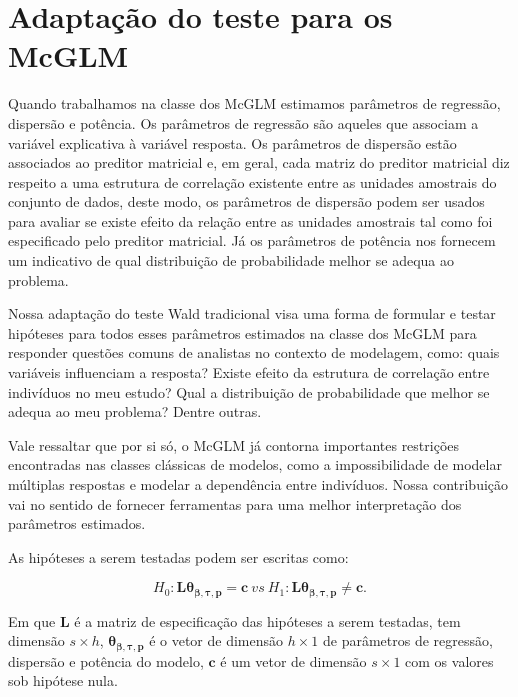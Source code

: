\section{Adaptação do teste para os McGLM}

Quando trabalhamos na classe dos McGLM estimamos parâmetros de regressão, dispersão e potência. Os parâmetros de regressão são aqueles que associam a variável explicativa à variável resposta. Os parâmetros de dispersão estão associados ao preditor matricial e, em geral, cada matriz do preditor matricial diz respeito a uma estrutura de correlação existente entre as unidades amostrais do conjunto de dados, deste modo, os parâmetros de dispersão podem ser usados para avaliar se existe efeito da relação entre as unidades amostrais tal como foi especificado pelo preditor matricial. Já os parâmetros de potência nos fornecem um indicativo de qual distribuição de probabilidade melhor se adequa ao problema. 

Nossa adaptação do teste Wald tradicional visa uma forma de formular e testar hipóteses para todos esses parâmetros estimados na classe dos McGLM para responder questões comuns de analistas no contexto de modelagem, como: quais variáveis influenciam a resposta? Existe efeito da estrutura de correlação entre indivíduos no meu estudo? Qual a distribuição de probabilidade que melhor se adequa ao meu problema? Dentre outras.

Vale ressaltar que por si só, o McGLM já contorna importantes restrições encontradas nas classes clássicas de modelos, como a impossibilidade de modelar múltiplas respostas e modelar a dependência entre indivíduos. Nossa contribuição vai no sentido de fornecer ferramentas para uma melhor interpretação dos parâmetros estimados.

As hipóteses a serem testadas podem ser escritas como:

\begin{equation}
H_0: \boldsymbol{L}\boldsymbol{\theta_{\beta,\tau,p}} = \boldsymbol{c} \ vs \ H_1: \boldsymbol{L}\boldsymbol{\theta_{\beta,\tau,p}} \neq \boldsymbol{c}. 
\end{equation}

\noindent Em que $\boldsymbol{L}$ é a matriz de especificação das hipóteses a serem testadas, tem dimensão $s \times h$, $\boldsymbol{\theta_{\beta,\tau,p}}$ é o vetor de dimensão $h \times 1$ de parâmetros de regressão, dispersão e potência do modelo, $\boldsymbol{c}$ é um vetor de dimensão $s \times 1$ com os valores sob hipótese nula.

